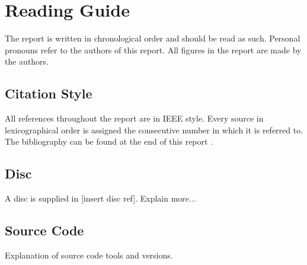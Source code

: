 \chapter*{Reading Guide}
The report is written in chronological order and should be read as such. Personal pronouns refer to the authors of this report. All figures in the report are made by the authors.

\section*{Citation Style}
All references throughout the report are in IEEE style. Every source in lexicographical order is assigned the consecutive number in which it is referred to. The bibliography can be found at the end of this report .

\section*{Disc}
A disc is supplied in [insert disc ref]. Explain more... %

\section*{Source Code}
Explanation of source code tools and versions.
